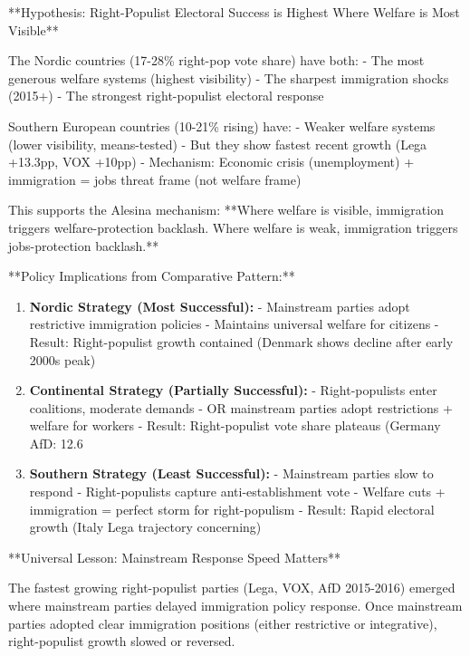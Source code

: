 **Hypothesis: Right-Populist Electoral Success is Highest Where Welfare is Most Visible**

The Nordic countries (17-28\% right-pop vote share) have both:
- The most generous welfare systems (highest visibility)
- The sharpest immigration shocks (2015+)
- The strongest right-populist electoral response

Southern European countries (10-21\% rising) have:
- Weaker welfare systems (lower visibility, means-tested)
- But they show fastest recent growth (Lega +13.3pp, VOX +10pp)
- Mechanism: Economic crisis (unemployment) + immigration = jobs threat frame (not welfare frame)

This supports the Alesina mechanism: **Where welfare is visible, immigration triggers welfare-protection backlash. Where welfare is weak, immigration triggers jobs-protection backlash.**

**Policy Implications from Comparative Pattern:**

\begin{enumerate}

\item \textbf{Nordic Strategy (Most Successful):}
   - Mainstream parties adopt restrictive immigration policies
   - Maintains universal welfare for citizens
   - Result: Right-populist growth contained (Denmark shows decline after early 2000s peak)

\item \textbf{Continental Strategy (Partially Successful):}
   - Right-populists enter coalitions, moderate demands
   - OR mainstream parties adopt restrictions + welfare for workers
   - Result: Right-populist vote share plateaus (Germany AfD: 12.6%

\item \textbf{Southern Strategy (Least Successful):}
   - Mainstream parties slow to respond
   - Right-populists capture anti-establishment vote
   - Welfare cuts + immigration = perfect storm for right-populism
   - Result: Rapid electoral growth (Italy Lega trajectory concerning)

\end{enumerate}

**Universal Lesson: Mainstream Response Speed Matters**

The fastest growing right-populist parties (Lega, VOX, AfD 2015-2016) emerged where mainstream parties delayed immigration policy response. Once mainstream parties adopted clear immigration positions (either restrictive or integrative), right-populist growth slowed or reversed.

